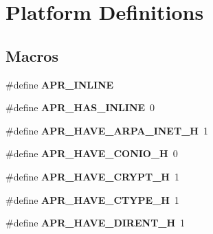 \hypertarget{group__apr__platform}{}\section{Platform Definitions}
\label{group__apr__platform}
\subsection*{Macros}
\begin{DoxyCompactItemize}
\item 
\#define {\bfseries A\+P\+R\+\_\+\+I\+N\+L\+I\+NE}\hypertarget{group__apr__platform_gaada0f3e7bf27ea51795c2c27c20aee84}{}\label{group__apr__platform_gaada0f3e7bf27ea51795c2c27c20aee84}

\item 
\#define {\bfseries A\+P\+R\+\_\+\+H\+A\+S\+\_\+\+I\+N\+L\+I\+NE}~0\hypertarget{group__apr__platform_ga1bfff486847c3fe487884bca79cb21fd}{}\label{group__apr__platform_ga1bfff486847c3fe487884bca79cb21fd}

\item 
\#define {\bfseries A\+P\+R\+\_\+\+H\+A\+V\+E\+\_\+\+A\+R\+P\+A\+\_\+\+I\+N\+E\+T\+\_\+H}~1\hypertarget{group__apr__platform_gaa6740450eabc6384924801d569e89742}{}\label{group__apr__platform_gaa6740450eabc6384924801d569e89742}

\item 
\#define {\bfseries A\+P\+R\+\_\+\+H\+A\+V\+E\+\_\+\+C\+O\+N\+I\+O\+\_\+H}~0\hypertarget{group__apr__platform_ga24eb6d10ed0942ee4a4228df697fd5bb}{}\label{group__apr__platform_ga24eb6d10ed0942ee4a4228df697fd5bb}

\item 
\#define {\bfseries A\+P\+R\+\_\+\+H\+A\+V\+E\+\_\+\+C\+R\+Y\+P\+T\+\_\+H}~1\hypertarget{group__apr__platform_ga38a75f33c3096b153d5302c0370e9e38}{}\label{group__apr__platform_ga38a75f33c3096b153d5302c0370e9e38}

\item 
\#define {\bfseries A\+P\+R\+\_\+\+H\+A\+V\+E\+\_\+\+C\+T\+Y\+P\+E\+\_\+H}~1\hypertarget{group__apr__platform_gad0fe0c5bffd8073cb57178ceb9761933}{}\label{group__apr__platform_gad0fe0c5bffd8073cb57178ceb9761933}

\item 
\#define {\bfseries A\+P\+R\+\_\+\+H\+A\+V\+E\+\_\+\+D\+I\+R\+E\+N\+T\+\_\+H}~1\hypertarget{group__apr__platform_ga87b424528fd6448c5aabc6cc61024c9a}{}\label{group__apr__platform_ga87b424528fd6448c5aabc6cc61024c9a}


\end{DoxyCompactItemize}
